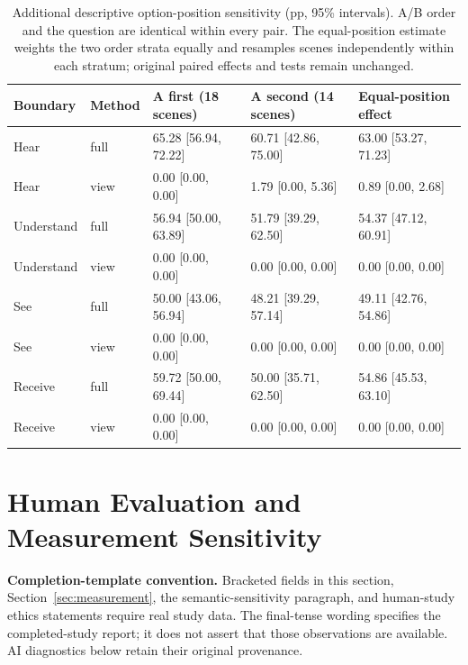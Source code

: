 \begin{table}[t]
\centering\small
\begin{lrbox}{\OCtable}\begin{tabular}{@{}lllll@{}}
\toprule
Boundary & Method & A first (18 scenes) & A second (14 scenes) & Equal-position effect\\
\midrule
Hear & full & 65.28 [56.94, 72.22] & 60.71 [42.86, 75.00] & 63.00 [53.27, 71.23]\\
Hear & view & 0.00 [0.00, 0.00] & 1.79 [0.00, 5.36] & 0.89 [0.00, 2.68]\\
Understand & full & 56.94 [50.00, 63.89] & 51.79 [39.29, 62.50] & 54.37 [47.12, 60.91]\\
Understand & view & 0.00 [0.00, 0.00] & 0.00 [0.00, 0.00] & 0.00 [0.00, 0.00]\\
See & full & 50.00 [43.06, 56.94] & 48.21 [39.29, 57.14] & 49.11 [42.76, 54.86]\\
See & view & 0.00 [0.00, 0.00] & 0.00 [0.00, 0.00] & 0.00 [0.00, 0.00]\\
Receive & full & 59.72 [50.00, 69.44] & 50.00 [35.71, 62.50] & 54.86 [45.53, 63.10]\\
Receive & view & 0.00 [0.00, 0.00] & 0.00 [0.00, 0.00] & 0.00 [0.00, 0.00]\\
\bottomrule
\end{tabular}\end{lrbox}
\ifdim\wd\OCtable>\linewidth\PackageError{access-paper}{Table tab:choiceorder exceeds its column}{Revise the table layout.}\fi
\usebox{\OCtable}
\caption{Additional descriptive option-position sensitivity (pp, 95\% intervals). A/B order and the question are identical within every pair. The equal-position estimate weights the two order strata equally and resamples scenes independently within each stratum; original paired effects and tests remain unchanged.}
\label{tab:choiceorder}
\end{table}

\section{Human Evaluation and Measurement Sensitivity}
\label{app:validation}
\textbf{Completion-template convention.} Bracketed fields in this section, Section~\ref{sec:measurement}, the semantic-sensitivity paragraph, and human-study ethics statements require real study data. The final-tense wording specifies the completed-study report; it does not assert that those observations are available. AI diagnostics below retain their original provenance.

